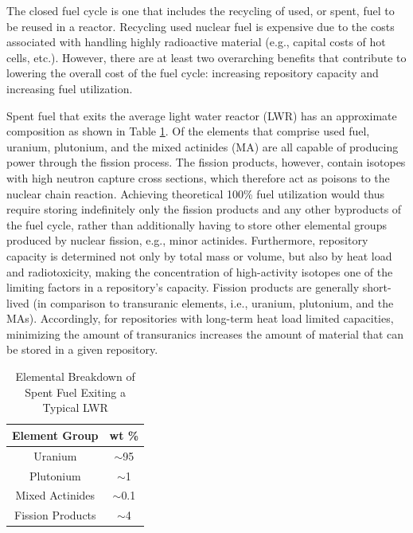 The closed fuel cycle is one that includes the recycling of used, or spent, fuel
to be reused in a reactor. Recycling used nuclear fuel is expensive due to the
costs associated with handling highly radioactive material (e.g., capital costs
of hot cells, etc.). However, there are at least two overarching benefits that
contribute to lowering the overall cost of the fuel cycle: increasing repository
capacity and increasing fuel utilization.

Spent fuel that exits the average light water reactor (LWR) has an approximate
composition as shown in Table \ref{tab:lwr_fuel}. Of the elements that comprise
used fuel, uranium, plutonium, and the mixed actinides (MA) are all capable of
producing power through the fission process. The fission products, however,
contain isotopes with high neutron capture cross sections, which therefore act
as poisons to the nuclear chain reaction. Achieving theoretical 100\% fuel
utilization would thus require storing indefinitely only the fission products
and any other byproducts of the fuel cycle, rather than additionally having to
store other elemental groups produced by nuclear fission, e.g., minor
actinides. Furthermore, repository capacity is determined not only by total mass
or volume, but also by heat load and radiotoxicity, making the concentration of
high-activity isotopes one of the limiting factors in a repository's
capacity. Fission products are generally short-lived (in comparison to
transuranic elements, i.e., uranium, plutonium, and the MAs). Accordingly, for
repositories with long-term heat load limited capacities, minimizing the amount
of transuranics increases the amount of material that can be stored in a given
repository.

\begin{table} [h]
\centering
\begin{tabular} {|c|c|} 
\hline
Element Group & wt \% \\
\hline
Uranium           & $\sim$95  \\
Plutonium         & $\sim$1   \\
Mixed Actinides   & $\sim$0.1 \\
Fission Products  & $\sim$4   \\
\hline
\end{tabular}
\caption{Elemental Breakdown of Spent Fuel Exiting a Typical LWR}
\label{tab:lwr_fuel}
\end{table}

